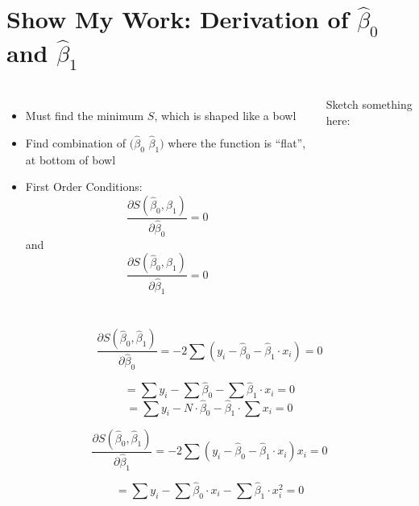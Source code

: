 \documentclass[10pt,english]{beamer}
\def\lyxframeend{} %
\newenvironment{topcolumns}{\begin{columns}[t]}{\end{columns}}
\begin{document}
\lyxframeend{}\section{Show My Work: Derivation of $\hat{\beta}_{0}$ and $\hat{\beta}_{1}$}


\lyxframeend{}
\begin{topcolumns}%


\column{5cm}
\begin{itemize}
\item Must find the minimum $S$, which is shaped like a bowl
\item Find combination of $(\hat{\beta}_{0}$ $\hat{\beta}_{1})$ where
the function is ``flat'', at bottom of bowl
\item First Order Conditions: 
\begin{equation}
\frac{\partial S(\hat{\beta}_{0},\hat{\beta}_{1})}{\partial\hat{\beta}_{0}}=0
\end{equation}
 and 
\begin{equation}
\frac{\partial S(\hat{\beta}_{0},\hat{\beta}_{1})}{\partial\hat{\beta}_{1}}=0
\end{equation}

\end{itemize}

\column{6cm}


Sketch something here:

\end{topcolumns}%

\lyxframeend{}

\[
\frac{\partial S(\hat{\beta}_{0},\hat{\beta}_{1})}{\partial\hat{\beta}_{0}}=-2\sum(y_{i}-\hat{\beta}_{0}-\hat{\beta}_{1}\cdot x_{i})=0
\]


\[
=\sum y_{i}-\sum\hat{\beta}_{0}-\sum\hat{\beta}_{1}\cdot x_{i}=0
\]
\begin{equation}
=\sum y_{i}-N\cdot\hat{\beta}_{0}-\hat{\beta}_{1}\cdot\sum x_{i}=0\label{N1}
\end{equation}



\lyxframeend{}

\[
\frac{\partial S(\hat{\beta}_{0},\hat{\beta}_{1})}{\partial\hat{\beta}_{1}}=-2\sum(y_{i}-\hat{\beta}_{0}-\hat{\beta}_{1}\cdot x_{i})x_{i}=0
\]


\begin{equation}
=\sum y_{i}-\sum\hat{\beta}_{0}\cdot x_{i}-\sum\hat{\beta}_{1}\cdot x_{i}^{2}=0\label{N2}
\end{equation}
\end{document}
